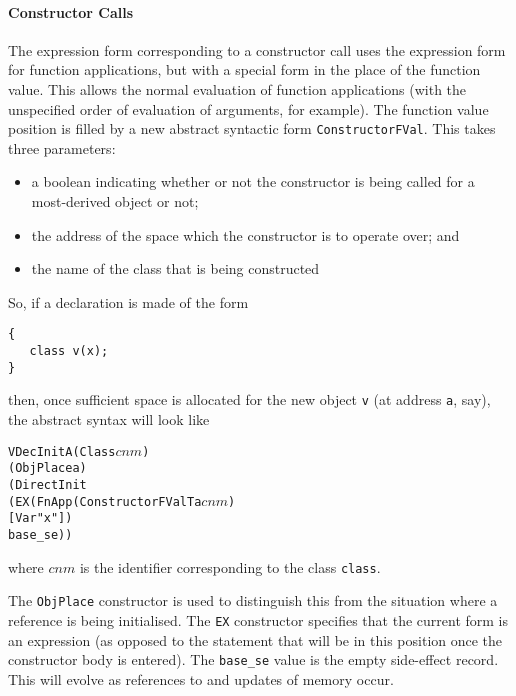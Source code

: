 \documentclass[11pt]{article}
\begin{document}
\paragraph{Constructor Calls}
The expression form corresponding to a constructor call uses the
expression form for function applications, but with a special form in
the place of the function value.  This allows the normal evaluation of
function applications (with the unspecified order of evaluation of
arguments, for example).  The function value position is filled by a
new abstract syntactic form
\texttt{ConstructorFVal}.
This takes three parameters:
\begin{itemize}
\item a boolean indicating whether or not the constructor is being
  called for a most-derived object or not;
\item the address of the space which the constructor is to operate
  over; and
\item the name of the class that is being constructed
\end{itemize}
So, if a declaration is made of the form
\begin{verbatim}
{
   class v(x);
}
\end{verbatim}
then, once sufficient space is allocated for the new object \texttt{v}
(at address \texttt{a}, say), the abstract syntax will look like
\begin{alltt}
   VDecInitA (Class \(\mathit{cnm}\))
             (ObjPlace a)
             (DirectInit
                (EX (FnApp (ConstructorFVal T a \(\mathit{cnm}\))
                           [Var "x"])
                    base_se))
\end{alltt}
where $\mathit{cnm}$ is the identifier corresponding to the class
\texttt{class}.

The \texttt{ObjPlace} constructor is used to distinguish this from the
situation where a reference is being initialised.  The \texttt{EX}
constructor specifies that the current form is an expression (as
opposed to the statement that will be in this position once the
constructor body is entered).  The \texttt{base_se} value is the empty
side-effect record.  This will evolve as references to and updates of
memory occur.
\end{document}
